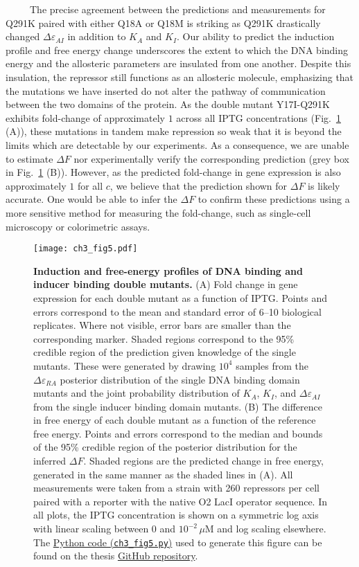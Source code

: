 \documentclass[12pt]{caltech_thesis}
\begin{document}
~~~~~The precise agreement between the predictions and measurements for
Q291K paired with either Q18A or Q18M is striking as Q291K drastically
changed \(\Delta\varepsilon_{AI}\) in addition to \(K_A\) and \(K_I\).
Our ability to predict the induction profile and free energy change
underscores the extent to which the DNA binding energy and the
allosteric parameters are insulated from one another. Despite this
insulation, the repressor still functions as an allosteric molecule,
emphasizing that the mutations we have inserted do not alter the pathway
of communication between the two domains of the protein. As the double
mutant Y17I-Q291K exhibits fold-change of approximately \(1\) across all
IPTG concentrations (Fig.~\ref{fig:dbl_muts} (A)), these mutations in
tandem make repression so weak that it is beyond the limits which are
detectable by our experiments. As a consequence, we are unable to
estimate \(\Delta F\) nor experimentally verify the corresponding
prediction (grey box in Fig.~\ref{fig:dbl_muts} (B)). However, as the
predicted fold-change in gene expression is also approximately \(1\) for
all \(c\), we believe that the prediction shown for \(\Delta F\) is
likely accurate. One would be able to infer the \(\Delta F\) to confirm
these predictions using a more sensitive method for measuring the
fold-change, such as single-cell microscopy or colorimetric assays.

\hypertarget{fig:dbl_muts}{%
\begin{figure}
\centering
\texttt{[image: ch3\_fig5.pdf]}
\caption[{Induction and free-energy profiles of DNA binding and inducer
binding double mutants.}]{\textbf{Induction and free-energy profiles of
DNA binding and inducer binding double mutants.} (A) Fold change in gene
expression for each double mutant as a function of IPTG. Points and
errors correspond to the mean and standard error of 6--10 biological
replicates. Where not visible, error bars are smaller than the
corresponding marker. Shaded regions correspond to the 95\% credible
region of the prediction given knowledge of the single mutants. These
were generated by drawing \(10^4\) samples from the
\(\Delta\varepsilon_{RA}\) posterior distribution of the single DNA
binding domain mutants and the joint probability distribution of
\(K_A\), \(K_I\), and \(\Delta\varepsilon_{AI}\) from the single inducer
binding domain mutants. (B) The difference in free energy of each double
mutant as a function of the reference free energy. Points and errors
correspond to the median and bounds of the 95\% credible region of the
posterior distribution for the inferred \(\Delta F\). Shaded regions are
the predicted change in free energy, generated in the same manner as the
shaded lines in (A). All measurements were taken from a strain with 260
repressors per cell paired with a reporter with the native O2 LacI
operator sequence. In all plots, the IPTG concentration is shown on a
symmetric log axis with linear scaling between 0 and \(10^{-2}\,\mu\)M
and log scaling elsewhere. The
\href{https://github.com/gchure/phd/blob/master/src/chapter_03/code/ch3_fig5.py}{Python
code (\texttt{ch3\_fig5.py})} used to generate this figure can be found
on the thesis \href{https://github.com/gchure/phd}{GitHub repository}.}
\label{fig:dbl_muts}
\end{figure}
}
\end{document}
